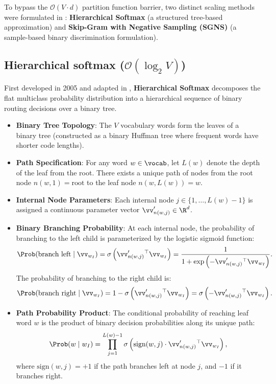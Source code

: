 \documentclass[../../main.tex]{subfiles}
\begin{document}
To bypass the $\mathcal{O}(V \cdot d)$ partition function barrier, two distinct scaling methods were formulated in \cite{mikolov2013distributed}: \textbf{Hierarchical Softmax} (a structured tree-based approximation) and \textbf{Skip-Gram with Negative Sampling (SGNS)} (a sample-based binary discrimination formulation).

\subsection{Hierarchical softmax (\texorpdfstring{$\mathcal{O}(\log_2 V)$}{O(log2 V)})}
\label{subsec:hierarchical_softmax}

First developed in 2005 \cite{morin2005hierarchical} and adapted in \cite{mikolov2013distributed}, \textbf{Hierarchical Softmax} decomposes the flat multiclass probability distribution into a hierarchical sequence of binary routing decisions over a binary tree.

\begin{itemize}
    \item \textbf{Binary Tree Topology}: The $V$ vocabulary words form the leaves of a binary tree (constructed as a binary Huffman tree where frequent words have shorter code lengths).
    \item \textbf{Path Specification}: For any word $w \in \vocab$, let $L(w)$ denote the depth of the leaf from the root. There exists a unique path of nodes from the root node $n(w, 1) = \text{root}$ to the leaf node $n(w, L(w)) = w$.
    \item \textbf{Internal Node Parameters}: Each internal node $j \in \{1, \dots, L(w)-1\}$ is assigned a continuous parameter vector $\vv'_{n(w, j)} \in \R^d$.
    \item \textbf{Binary Branching Probability}: At each internal node, the probability of branching to the left child is parameterized by the logistic sigmoid function:
    \begin{equation}
    \label{eq:hierarchical_branch}
    \Prob(\text{branch left} \mid \vv_{w_I}) = \sigma\left( \vv'_{n(w, j)}{}^\top \vv_{w_I} \right) = \frac{1}{1 + \exp\left( -\vv'_{n(w, j)}{}^\top \vv_{w_I} \right)}.
    \end{equation}
    The probability of branching to the right child is:
    \begin{equation}
    \label{eq:hierarchical_right}
    \Prob(\text{branch right} \mid \vv_{w_I}) = 1 - \sigma\left( \vv'_{n(w, j)}{}^\top \vv_{w_I} \right) = \sigma\left( -\vv'_{n(w, j)}{}^\top \vv_{w_I} \right).
    \end{equation}
    \item \textbf{Path Probability Product}: The conditional probability of reaching leaf word $w$ is the product of binary decision probabilities along its unique path:
    \begin{equation}
    \label{eq:hierarchical_softmax}
    \Prob(w \mid w_I) = \prod_{j=1}^{L(w)-1} \sigma\left( \text{sign}(w, j) \cdot \vv'_{n(w, j)}{}^\top \vv_{w_I} \right),
    \end{equation}
    where $\text{sign}(w, j) = +1$ if the path branches left at node $j$, and $-1$ if it branches right.
\end{itemize}
\end{document}
